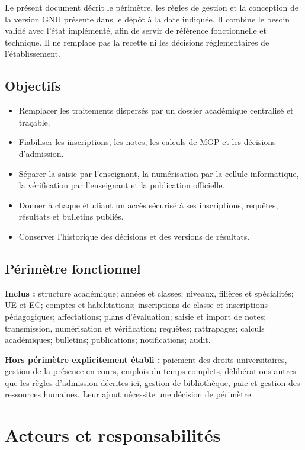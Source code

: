 \documentclass[11pt,a4paper]{article}
\begin{document}
Le présent document décrit le périmètre, les règles de gestion et la conception de la version GNU présente dans le dépôt à la date indiquée. Il combine le besoin validé avec l’état implémenté, afin de servir de référence fonctionnelle et technique. Il ne remplace pas la recette ni les décisions réglementaires de l’établissement.

\subsection{Objectifs}
\begin{itemize}
  \item Remplacer les traitements dispersés par un dossier académique centralisé et traçable.
  \item Fiabiliser les inscriptions, les notes, les calculs de MGP et les décisions d'admission.
  \item Séparer la saisie par l'enseignant, la numérisation par la cellule informatique, la vérification par l'enseignant et la publication officielle.
  \item Donner à chaque étudiant un accès sécurisé à ses inscriptions, requêtes, résultats et bulletins publiés.
  \item Conserver l'historique des décisions et des versions de résultats.
\end{itemize}

\subsection{Périmètre fonctionnel}
\textbf{Inclus :} structure académique; années et classes; niveaux, filières et spécialités; UE et EC; comptes et habilitations; inscriptions de classe et inscriptions pédagogiques; affectations; plans d'évaluation; saisie et import de notes; transmission, numérisation et vérification; requêtes; rattrapages; calculs académiques; bulletins; publications; notifications; audit.

\textbf{Hors périmètre explicitement établi :} paiement des droits universitaires, gestion de la présence en cours, emplois du temps complets, délibérations autres que les règles d'admission décrites ici, gestion de bibliothèque, paie et gestion des ressources humaines. Leur ajout nécessite une décision de périmètre.

\section{Acteurs et responsabilités}
\end{document}
